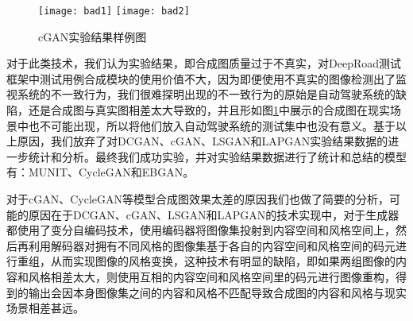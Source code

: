 \begin{figure}[h]
    \centering
    \texttt{[image: bad1]}
    \texttt{[image: bad2]}
    \caption{cGAN实验结果样例图}
    \label{bad-res}
\end{figure}

对于此类技术，我们认为实验结果，即合成图质量过于不真实，对DeepRoad测试框架中测试用例合成模块的使用价值不大，因为即便使用不真实的图像检测出了监视系统的不一致行为，我们很难探明出现的不一致行为的原始是自动驾驶系统的缺陷，还是合成图与真实图相差太大导致的，并且形如图\ref{bad-res}中展示的合成图在现实场景中也不可能出现，所以将他们放入自动驾驶系统的测试集中也没有意义。基于以上原因，我们放弃了对DCGAN、cGAN、LSGAN和LAPGAN实验结果数据的进一步统计和分析。最终我们成功实验，并对实验结果数据进行了统计和总结的模型有：MUNIT、CycleGAN和EBGAN。

对于cGAN、CycleGAN等模型合成图效果太差的原因我们也做了简要的分析，可能的原因在于DCGAN、cGAN、LSGAN和LAPGAN的技术实现中，对于生成器都使用了变分自编码技术\cite{vae}，使用编码器将图像集投射到内容空间和风格空间上，然后再利用解码器对拥有不同风格的图像集基于各自的内容空间和风格空间的码元进行重组，从而实现图像的风格变换，这种技术有明显的缺陷，即如果两组图像的内容和风格相差太大，则使用互相的内容空间和风格空间里的码元进行图像重构，得到的输出会因本身图像集之间的内容和风格不匹配导致合成图的内容和风格与现实场景相差甚远。 

